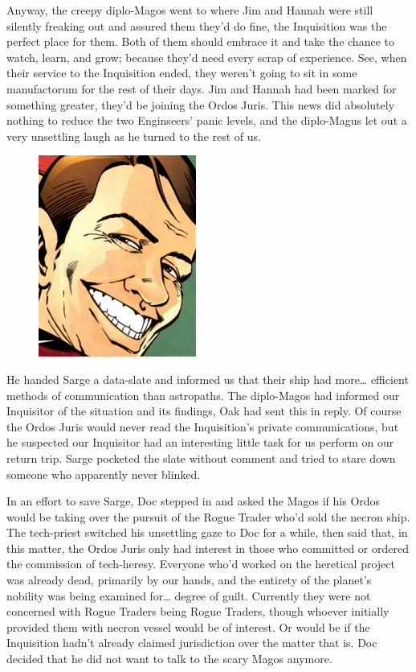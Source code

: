 Anyway, the creepy diplo-Magos went to where Jim and Hannah were still silently freaking out and assured them they'd do fine, the Inquisition was the perfect place for them. 
Both of them should embrace it and take the chance to watch, learn, and grow; 
because they'd need every scrap of experience. 
See, when their service to the Inquisition ended, they weren't going to sit in some manufactorum for the rest of their days. 
Jim and Hannah had been marked for something greater, they'd be joining the Ordos Juris. 
This news did absolutely nothing to reduce the two Enginseers' panic levels, and the diplo-Magus let out a very unsettling laugh as he turned to the rest of us.

\begin{figure}
	\begin{center}
		\includegraphics[width=\figwidth]{pics/11/102.png}
	\end{center}
\end{figure}
He handed Sarge a data-slate and informed us that their ship had more… efficient methods of communication than astropaths. 
The diplo-Magos had informed our Inquisitor of the situation and its findings, Oak had sent this in reply. 
Of course the Ordos Juris would never read the Inquisition's private communications, but he suspected our Inquisitor had an interesting little task for us perform on our return trip. 
Sarge pocketed the slate without comment and tried to stare down someone who apparently never blinked.

In an effort to save Sarge, Doc stepped in and asked the Magos if his Ordos would be taking over the pursuit of the Rogue Trader who'd sold the necron ship. 
The tech-priest switched his unsettling gaze to Doc for a while, then said that, in this matter, the Ordos Juris only had interest in those who committed or ordered the commission of tech-heresy. 
Everyone who'd worked on the heretical project was already dead, primarily by our hands, and the entirety of the planet's nobility was being examined for… degree of guilt. 
Currently they were not concerned with Rogue Traders being Rogue Traders, though whoever initially provided them with necron vessel would be of interest. 
Or would be if the Inquisition hadn't already claimed jurisdiction over the matter that is. 
Doc decided that he did not want to talk to the scary Magos anymore. 


